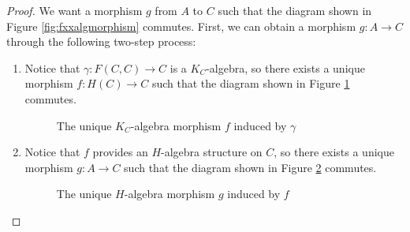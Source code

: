 \documentclass{msthesis}
\theoremstyle{definition}
\begin{document}
\begin{proof}
    We want a morphism $g$ from $A$ to $C$ such that the diagram shown in Figure \ref{fig:fxxalgmorphism} commutes.
    First, we can obtain a morphism $g : A \to C$ through the following two-step process:
    \begin{enumerate}[nosep]
        \item Notice that $\gamma : F(C,C) \to C$ is a $K_C$-algebra, so there exists a unique morphism $f : H(C) \to C$ such that the diagram shown in Figure \ref{fig:kcalgmorphism} commutes.

        \begin{figure}
        \centering
        {
        }
        \caption{The unique $K_C$-algebra morphism  $f$ induced by $\gamma$}
        \label{fig:kcalgmorphism}
        \end{figure}

        \item Notice that $f$ provides an $H$-algebra structure on $C$, so there exists a unique morphism $g : A \to C$ such that the diagram shown in Figure \ref{fig:halgmorphism} commutes.

        \begin{figure}
        \centering
        {
        }
        \caption{The unique $H$-algebra morphism $g$ induced by $f$}
        \label{fig:halgmorphism}
        \end{figure}
    \end{enumerate}


\end{proof}
\end{document}
